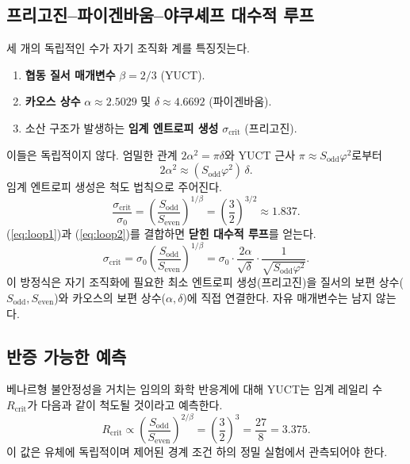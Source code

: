 \documentclass[11pt,a4paper]{article}
\begin{document}
	\subsection{프리고진–파이겐바움–야쿠셰프 대수적 루프}
	
	세 개의 독립적인 수가 자기 조직화 계를 특징짓는다.
	\begin{enumerate}
		\item \textbf{협동 질서 매개변수} \(\beta = 2/3\) (YUCT).
		\item \textbf{카오스 상수} \(\alpha \approx 2.5029\) 및 \(\delta \approx 4.6692\) (파이겐바움).
		\item 소산 구조가 발생하는 \textbf{임계 엔트로피 생성} \(\sigma_{\mathrm{crit}}\) (프리고진).
	\end{enumerate}
	이들은 독립적이지 않다. 엄밀한 관계 \(2\alpha^2 = \pi\delta\)와 YUCT 근사 \(\pi \approx S_{\mathrm{odd}}\varphi^2\)로부터
	\begin{equation}
		2\alpha^2 \approx (S_{\mathrm{odd}}\varphi^2)\,\delta .
		\label{eq:loop1}
	\end{equation}
	임계 엔트로피 생성은 척도 법칙으로 주어진다.
	\begin{equation}
		\frac{\sigma_{\mathrm{crit}}}{\sigma_0} = \left( \frac{S_{\mathrm{odd}}}{S_{\mathrm{even}}} \right)^{1/\beta}
		= \left( \frac{3}{2} \right)^{3/2} \approx 1.837 .
		\label{eq:loop2}
	\end{equation}
	(\ref{eq:loop1})과 (\ref{eq:loop2})를 결합하면 \textbf{닫힌 대수적 루프}를 얻는다.
	\[
	\boxed{
		\sigma_{\mathrm{crit}} = \sigma_0 \left( \frac{S_{\mathrm{odd}}}{S_{\mathrm{even}}} \right)^{1/\beta}
		= \sigma_0 \cdot \frac{2\alpha}{\sqrt{\delta}} \cdot \frac{1}{\sqrt{S_{\mathrm{odd}}\varphi^2}} .
	}
	\]
	이 방정식은 자기 조직화에 필요한 최소 엔트로피 생성(프리고진)을 질서의 보편 상수(\(S_{\mathrm{odd}},S_{\mathrm{even}}\))와 카오스의 보편 상수(\(\alpha,\delta\))에 직접 연결한다. 자유 매개변수는 남지 않는다.
	
	\subsection{반증 가능한 예측}
	
	베나르형 불안정성을 거치는 임의의 화학 반응계에 대해 YUCT는 임계 레일리 수 \(R_{\mathrm{crit}}\)가 다음과 같이 척도될 것이라고 예측한다.
	\[
	R_{\mathrm{crit}} \propto \left( \frac{S_{\mathrm{odd}}}{S_{\mathrm{even}}} \right)^{2/\beta}
	= \left( \frac{3}{2} \right)^3 = \frac{27}{8} = 3.375 .
	\]
	이 값은 유체에 독립적이며 제어된 경계 조건 하의 정밀 실험에서 관측되어야 한다.
	
\end{document}
